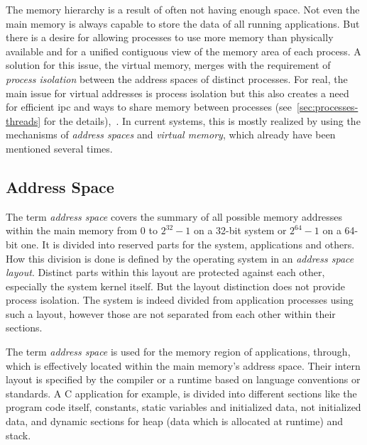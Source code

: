 The memory hierarchy is a result of often not having enough space.
Not even the main memory is always capable to store the data of all running applications. 
But there is a desire for allowing processes to use more memory than physically available and for a unified contiguous view of the memory area of each process.
A solution for this issue, the virtual memory, merges with the requirement of \textit{process isolation} between the address spaces of distinct processes.
For real, the main issue for virtual addresses is process isolation but this also creates a need for efficient \acf{ipc} and ways to share memory between processes (see~\ref{sec:processes-threads} for the details)\cite{mandl2014Grundkurs},~\cite{brause2017betriebssysteme}.
In current systems, this is mostly realized by using the mechanisms of \textit{address spaces} and \textit{virtual memory}, which already have been mentioned several times.


\subsection{Address Space}
The term \textit{address space} covers the summary of all possible memory addresses within the main memory from 0 to $2^{32}-1$ on a 32-bit system or $2^{64}-1$ on a 64-bit one. 
It is divided into reserved parts for the system, applications and others.
How this division is done is defined by the operating system in an \textit{address space layout}\cite{mandl2014Grundkurs}.
Distinct parts within this layout are protected against each other, especially the system kernel itself\cite{brause2017betriebssysteme}.
But the layout distinction does not provide process isolation. 
The system is indeed divided from application processes using such a layout, however those are not separated from each other within their sections\cite{mandl2014Grundkurs}.

The term \textit{address space} is used for the memory region of applications, through, which is effectively located within the main memory's address space.
Their intern layout is specified by the compiler or a runtime based on language conventions or standards.
A C application for example, is divided into different sections like the program code itself, constants, static variables and initialized data, not initialized data, and dynamic sections for heap (data which is allocated at runtime) and stack\cite{mandl2014Grundkurs}.

